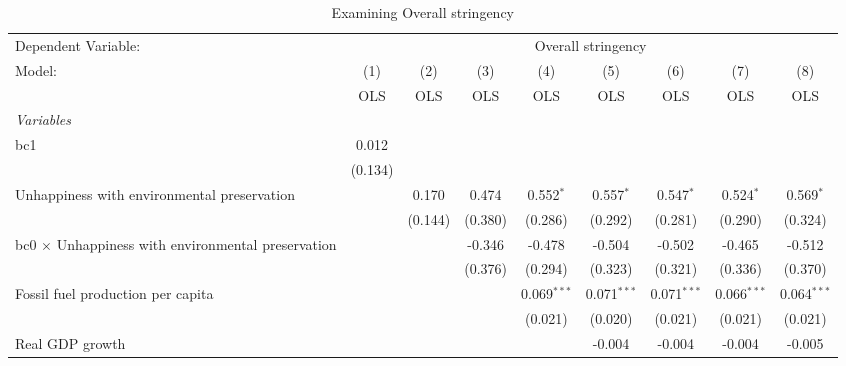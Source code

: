
\begin{table}[htbp]
   \caption{Examining Overall stringency}
   \centering
   \begin{tabular}{lcccccccc}
      \toprule
      Dependent Variable: & \multicolumn{8}{c}{Overall stringency}\\
      Model:                                                    & (1)     & (2)     & (3)     & (4)           & (5)           & (6)           & (7)           & (8)\\  
                                                                &  OLS    & OLS     & OLS     & OLS           & OLS           & OLS           & OLS           & OLS\\  
      \midrule
      \emph{Variables}\\
      bc1                                                       & 0.012   &         &         &               &               &               &               &   \\   
                                                                & (0.134) &         &         &               &               &               &               &   \\   
      Unhappiness with environmental preservation               &         & 0.170   & 0.474   & 0.552$^{*}$   & 0.557$^{*}$   & 0.547$^{*}$   & 0.524$^{*}$   & 0.569$^{*}$\\   
                                                                &         & (0.144) & (0.380) & (0.286)       & (0.292)       & (0.281)       & (0.290)       & (0.324)\\   
      bc0 $\times$ Unhappiness with environmental preservation  &         &         & -0.346  & -0.478        & -0.504        & -0.502        & -0.465        & -0.512\\   
                                                                &         &         & (0.376) & (0.294)       & (0.323)       & (0.321)       & (0.336)       & (0.370)\\   
      Fossil fuel production per capita                         &         &         &         & 0.069$^{***}$ & 0.071$^{***}$ & 0.071$^{***}$ & 0.066$^{***}$ & 0.064$^{***}$\\   
                                                                &         &         &         & (0.021)       & (0.020)       & (0.021)       & (0.021)       & (0.021)\\   
      Real GDP growth                                           &         &         &         &               & -0.004        & -0.004        & -0.004        & -0.005\\   

\end{tabular}
\end{table}
